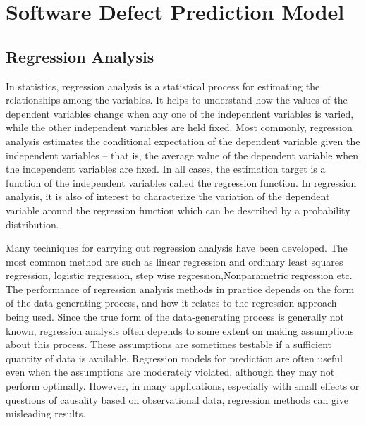 \documentclass[12pt]{report}
\begin{document}
\section{Software Defect Prediction Model}
\subsection{Regression Analysis}
In statistics, regression analysis is a statistical process for estimating the relationships among the variables. It helps to understand how the values of the dependent variables change when any one of the independent variables is varied, while the other independent variables are held fixed. Most commonly, regression analysis estimates the conditional expectation of the dependent variable given the independent variables – that is, the average value of the dependent variable when the independent variables are fixed. In all cases, the estimation target is a function of the independent variables called the regression function. In regression analysis, it is also of interest to characterize the variation of the dependent variable around the regression function which can be described by a probability distribution.

Many techniques for carrying out regression analysis have been developed. The most common method are such as linear regression and ordinary least squares regression, logistic regression, step wise regression,Nonparametric regression etc. 
The performance of regression analysis methods in practice depends on the form of the data generating process, and how it relates to the regression approach being used. Since the true form of the data-generating process is generally not known, regression analysis often depends to some extent on making assumptions about this process.
These assumptions are sometimes testable if a sufficient quantity of data is available. Regression models for prediction are often useful even when the assumptions are moderately violated, although they may not perform optimally. However, in many applications, especially with small effects or questions of causality based on observational data, regression methods can give misleading results.
\end{document}
